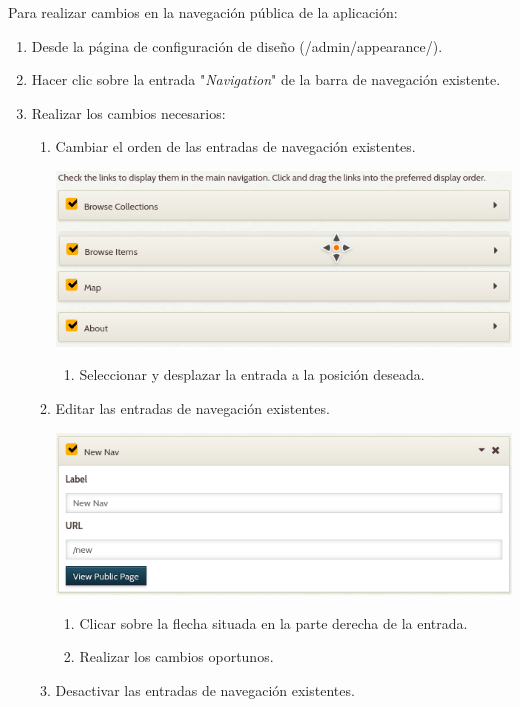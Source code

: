 \documentclass[
]{article}
\providecommand{\tightlist}{%
  \setlength{\itemsep}{0pt}\setlength{\parskip}{0pt}}
\begin{document}
Para realizar cambios en la navegación pública de la aplicación:

\begin{enumerate}
\def\labelenumi{\arabic{enumi}.}
\tightlist
\item
  Desde la página de configuración de diseño ({/admin/appearance/}).
\item
  Hacer clic sobre la entrada "\emph{Navigation}" de la barra de
  navegación existente.
\item
  Realizar los cambios necesarios:

  \begin{enumerate}
  \def\labelenumii{\alph{enumii}.}
  \item
    Cambiar el orden de las entradas de navegación existentes.

    \includegraphics{../_static/images/nav-1.png}

    \begin{enumerate}
    \def\labelenumiii{\arabic{enumiii}.}
    \tightlist
    \item
      Seleccionar y desplazar la entrada a la posición deseada.
    \end{enumerate}
  \item
    Editar las entradas de navegación existentes.

    \includegraphics{../_static/images/nav-2.png}

    \begin{enumerate}
    \def\labelenumiii{\arabic{enumiii}.}
    \tightlist
    \item
      Clicar sobre la flecha situada en la parte derecha de la entrada.
    \item
      Realizar los cambios oportunos.
    \end{enumerate}
  \item
    Desactivar las entradas de navegación existentes.


\end{enumerate}
\end{enumerate}
\end{document}
